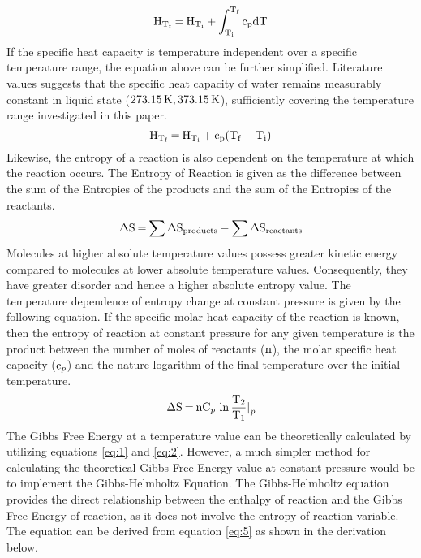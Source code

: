 \documentclass{article}
\begin{document}
\begin{equation}
\ce{H_{T_f} = H_{T_i}} + \int_{\mathrm{T_{i}}}^{\mathrm{T_{f}}} \mathrm{c_p dT} \label{eq:8}
\end{equation}
If the specific heat capacity is temperature independent over a specific temperature range, the equation above can be further simplified. Literature values suggests that the specific heat capacity of water remains measurably constant in liquid state ($\ce{273.15K, 373.15K}$), sufficiently covering the temperature range investigated in this paper.
\begin{equation}
\ce{H_{T_f} = H_{T_i} + \mathrm{c_p(T_f - T_i)}} \label{eq:1}
\end{equation}
Likewise, the entropy of a reaction is also dependent on the temperature at which the reaction occurs. The Entropy of Reaction is given as the difference between the sum of the Entropies of the products and the sum of the Entropies of the reactants. 
\begin{equation}
    \ce{\Delta S = \sum{\Delta S_{products}} - \sum{\Delta S_{reactants}}} \label{eq:10}
\end{equation}
\noindent
Molecules at higher absolute temperature values possess greater kinetic energy compared to molecules at lower absolute temperature values. Consequently, they have greater disorder and hence a higher absolute entropy value. The temperature dependence of entropy change at constant pressure is given by the following equation. If the specific molar heat capacity of the reaction is known, then the entropy of reaction at constant pressure for any given temperature is the product between the number of moles of reactants ($\ce{n}$), the molar specific heat capacity ($\ce{c_p}$) and the nature logarithm of the final temperature over the initial temperature.
\begin{equation}
\ce{\Delta S = nC_p \ln{\frac{\mathrm{T_2}}{\mathrm{T_1}}}|_p} \label{eq:2}
\end{equation}
The Gibbs Free Energy at a temperature value can be theoretically calculated by utilizing equations \ref{eq:1} and \ref{eq:2}. However, a much simpler method for calculating the theoretical Gibbs Free Energy value at constant pressure would be to implement the Gibbs-Helmholtz Equation. The Gibbs-Helmholtz equation provides the direct relationship between the enthalpy of reaction and the Gibbs Free Energy of reaction, as it does not involve the entropy of reaction variable. The equation can be derived from equation \ref{eq:5} as shown in the derivation below.
\end{document}
